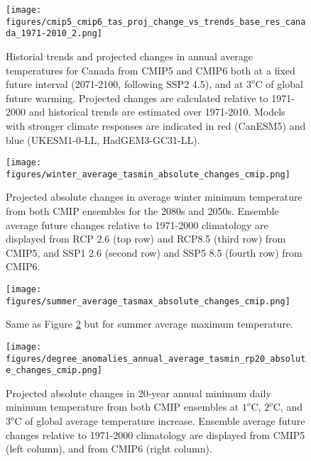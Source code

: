 \documentclass[]{scrartcl}
\begin{document}
\begin{figure}[ht!]
	\centering
	\texttt{[image: figures/cmip5\_cmip6\_tas\_proj\_change\_vs\_trends\_base\_res\_canada\_1971-2010\_2.png]}
	\caption[Tas]{Historial trends and projected changes in annual average temperatures for Canada from CMIP5 and CMIP6 both at a fixed future interval (2071-2100, following SSP2 4.5), and at $3^o$C of global future warming. Projected changes are calculated relative to 1971-2000 and historical trends are estimated over 1971-2010. Models with stronger climate responses are indicated in red (CanESM5) and blue (UKESM1-0-LL, HadGEM3-GC31-LL).}
	\label{fig:tas_scatter}
\end{figure}




\begin{figure}[ht!]
	\centering
	\texttt{[image: figures/winter\_average\_tasmin\_absolute\_changes\_cmip.png]}
	\caption[Pr]{Projected absolute changes in average winter minimum temperature from both CMIP ensembles for the 2080s and 2050s. Ensemble average future changes relative to 1971-2000 climatology are displayed from RCP 2.6 (top row) and RCP8.5 (third row) from CMIP5, and SSP1 2.6 (second row) and SSP5 8.5 (fourth row) from CMIP6.}
	\label{fig:win_tasmin_future}
\end{figure}


\begin{figure}[ht!]
	\centering
	\texttt{[image: figures/summer\_average\_tasmax\_absolute\_changes\_cmip.png]}
	\caption[Pr]{Same as Figure \ref{fig:win_tasmin_future} but for summer average maximum temperature.}
	\label{fig:sum_tasmax_future}
\end{figure}


\begin{figure}[ht!]
	\centering
	\texttt{[image: figures/degree\_anomalies\_annual\_average\_tasmin\_rp20\_absolute\_changes\_cmip.png]}
	\caption[Tas]{Projected absolute changes in 20-year annual minimum daily minimum temperature from both CMIP ensembles at $1^o$C, $2^o$C, and $3^o$C of global average temperature increase. Ensemble average future changes relative to 1971-2000 climatology are displayed from CMIP5 (left column), and from CMIP6 (right column).}
	\label{fig:ext_tasmin_deg_anoms}
\end{figure}
\end{document}
